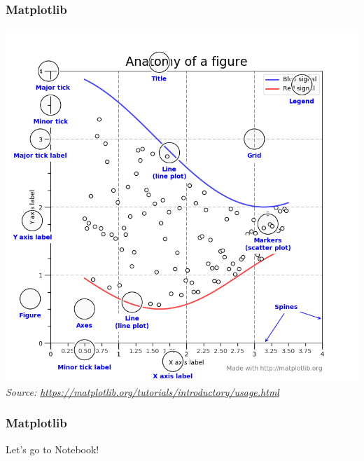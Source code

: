\documentclass[aspectratio=169]{beamer}
\begin{document}
\begin{frame}
    \frametitle{Matplotlib}
    \centering
    \includegraphics[scale=0.22]{images/matplotlib-anatomy.png}\\
    {\small \textit{Source: \url{https://matplotlib.org/tutorials/introductory/usage.html}}}
\end{frame}

\begin{frame}
    \frametitle{Matplotlib}
    \centering
    { \Huge Let's go to Notebook! }
\end{frame}
\end{document}
